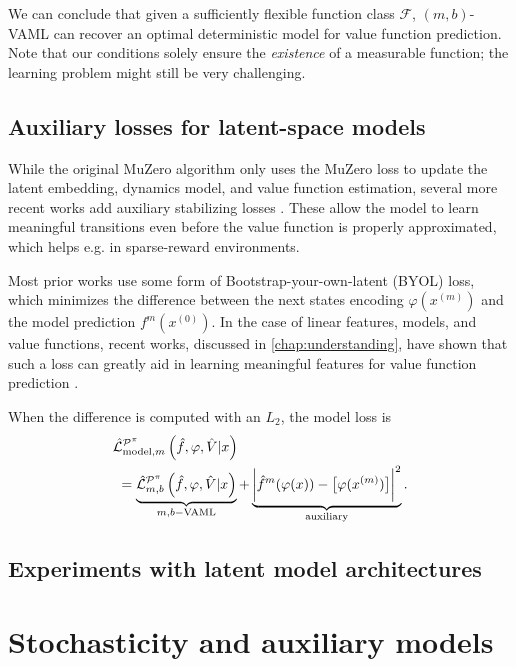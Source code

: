 We can conclude that given a sufficiently flexible function class $\mathcal{F}$, $(m,b)$-VAML can recover an optimal deterministic model for value function prediction.
Note that our conditions solely ensure the \emph{existence} of a measurable function; the learning problem might still be very challenging.


\subsection{Auxiliary losses for latent-space models}

While the original MuZero algorithm only uses the MuZero loss to update the latent embedding, dynamics model, and value function estimation, several more recent works add auxiliary stabilizing losses \parencite{ye2021mastering,hafner2021mastering,hansen2024tdmpc,voelcker2024mad}.
These allow the model to learn meaningful transitions even before the value function is properly approximated, which helps e.g. in sparse-reward environments.

Most prior works use some form of Bootstrap-your-own-latent (BYOL) \parencite{grill2020bootstrap} loss, which minimizes the difference between the next states encoding $\varphi(x^{(m)})$ and the model prediction $f^m(x^{(0)})$.
In the case of linear features, models, and value functions, recent works, discussed in \autoref{chap:understanding}, have shown that such a loss can greatly aid in learning meaningful features for value function prediction \parencite{lyle2021understanding,tang2022understanding,ni2024bridging,voelcker2024when}.

When the difference is computed with an $L_2$, the model loss is
\begin{align}
    & \hat{\mathcal{L}}^{\P^\pi}_{\mathrm{model}, m}\left(\hat{f},
\varphi, \hat{V}|x\right) \nonumber\\
    & ~ = \underbrace{\hat{\mathcal{L}}^{\P^\pi}_{m,b}\left(\hat{f},\varphi, \hat{V}|x\right)}_{m,b\mathrm{-VAML}} + \underbrace{\biggl| \hat{f}^m(\varphi(x)) - \bigl[\varphi(x^{(m)}) \bigr] \biggr|^2}_\mathrm{auxiliary}.
\end{align}

\subsection{Experiments with latent model architectures}


\section{Stochasticity and auxiliary models}
\label{sec:theory_2}

